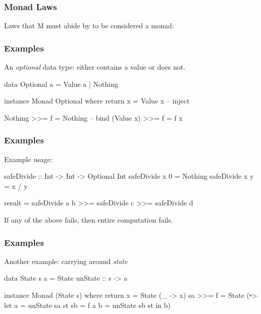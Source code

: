 \documentclass{beamer}
\begin{document}

\begin{frame}
\frametitle{Monad Laws}

Laws that M must abide by to be considered a monad:

\end{frame}


\begin{frame}[fragile]
\frametitle{Examples}

An \emph{optional} data type: either contains a value or does not.

\begin{code}
data Optional a = Value a | Nothing

instance Monad Optional where
  return x = Value x        -- inject

  Nothing   >>= f = Nothing -- bind
  (Value x) >>= f = f x
\end{code}

\end{frame}


\begin{frame}[fragile]
\frametitle{Examples}

Example usage:

\begin{code}
safeDivide :: Int -> Int -> Optional Int
safeDivide x 0 = Nothing
safeDivide x y = x / y

result = safeDivide a b >>= safeDivide c
                        >>= safeDivide d
\end{code}

If any of the above fails, then entire computation fails.

\end{frame}


\begin{frame}[fragile]
\frametitle{Examples}

Another example: carrying around \emph{state}

\begin{code}
data State s a = State { unState :: s -> a }

instance Monad (State s) where
  return x = State (\_ -> x)
  sa >>= f = State (\st -> let a  = unState sa st
                               sb = f a
                               b  = unState sb st
                           in b)
\end{code}

\end{frame}
\end{document}
